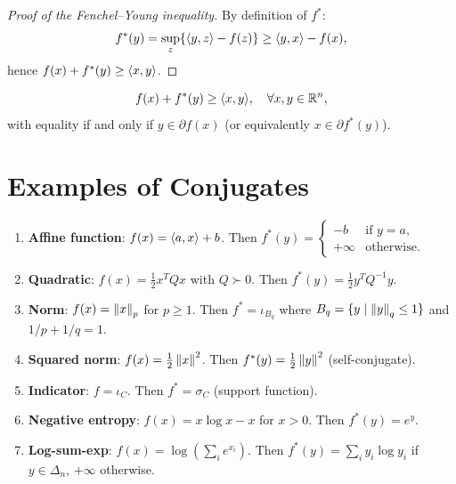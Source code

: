 \begin{proof}[Proof of the Fenchel--Young inequality]
By definition of $f^*$:
\[
    f^*(y) = \sup_{z} \{\langle y, z \rangle - f(z)\} \geq \langle y, x \rangle - f(x),
\]
hence $f(x) + f^*(y) \geq \langle x, y \rangle$.
\end{proof}

\begin{keyformulas}[title=\textbf{Fenchel--Young Inequality}]
\[
    f(x) + f^*(y) \geq \langle x, y \rangle, \quad \forall x, y \in \mathbb{R}^n,
\]
with equality if and only if $y \in \partial f(x)$ (or equivalently
$x \in \partial f^*(y)$).
\end{keyformulas}

\section{Examples of Conjugates}

\begin{example}
\begin{enumerate}
    \item \textbf{Affine function}: $f(x) = \langle a, x \rangle + b$.
    Then $f^*(y) = \begin{cases} -b & \text{if } y = a, \\ +\infty & \text{otherwise.}\end{cases}$

    \item \textbf{Quadratic}: $f(x) = \frac{1}{2}x^TQx$ with $Q \succ 0$.
    Then $f^*(y) = \frac{1}{2}y^TQ^{-1}y$.

    \item \textbf{Norm}: $f(x) = \left\| x \right\|_p$ for $p \geq 1$.
    Then $f^* = \iota_{B_q}$ where $B_q = \{y \mid \left\| y \right\|_q \leq 1\}$ and
    $1/p + 1/q = 1$.

    \item \textbf{Squared norm}: $f(x) = \frac{1}{2}\left\| x \right\|^2$.
    Then $f^*(y) = \frac{1}{2}\left\| y \right\|^2$ (self-conjugate).

    \item \textbf{Indicator}: $f = \iota_C$.
    Then $f^* = \sigma_C$ (support function).

    \item \textbf{Negative entropy}: $f(x) = x\log x - x$ for $x > 0$.
    Then $f^*(y) = e^y$.

    \item \textbf{Log-sum-exp}: $f(x) = \log(\sum_i e^{x_i})$.
    Then $f^*(y) = \sum_i y_i \log y_i$ if $y \in \Delta_n$, $+\infty$ otherwise.
\end{enumerate}
\end{example}

